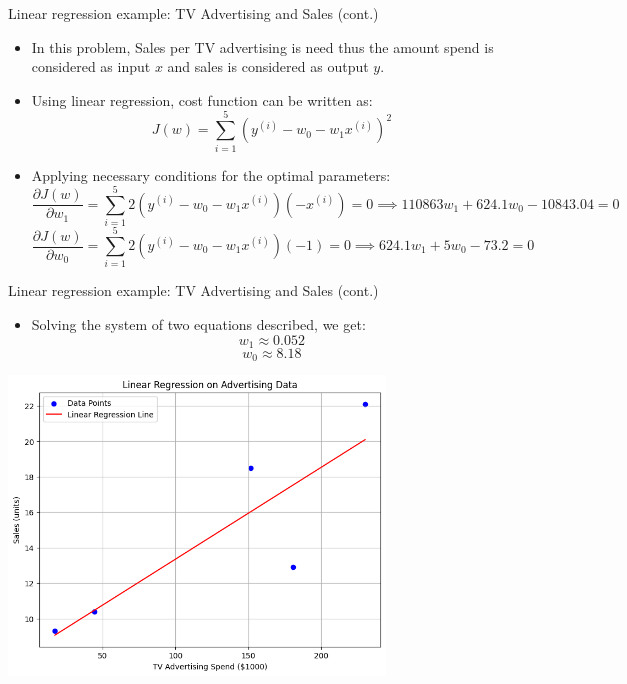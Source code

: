 \documentclass[serif, aspectratio=169]{beamer}
\begin{document}
\begin{frame}{Linear regression example: TV Advertising and Sales (cont.)}
    \begin{itemize}
        \item In this problem, Sales per TV advertising is need thus the amount spend is considered as input \( x \) and sales is considered as output \( y \). 
        \item Using linear regression, cost function can be written as:
        \[
        J(w) = \sum_{i=1}^{5} \left( y^{(i)} - w_0 - w_1 x^{(i)} \right)^2
        \]
        \item Applying necessary conditions for the optimal parameters:
        \[ 
        \frac{\partial J(w)}{\partial w_1} = \sum_{i=1}^{5} 2 \left( y^{(i)} - w_0 - w_1 x^{(i)} \right) (-x^{(i)}) = 0 \implies 110863 w_1 + 624.1 w_0 - 10843.04 = 0
        \]
        \[
        \frac{\partial J(w)}{\partial w_0} = \sum_{i=1}^{5} 2 \left( y^{(i)} - w_0 - w_1 x^{(i)} \right) (-1) = 0 \implies 624.1 w_1 + 5 w_0 - 73.2 = 0
        \]
    \end{itemize}
\end{frame}

\begin{frame}{Linear regression example: TV Advertising and Sales (cont.)}
\begin{minipage}{0.4\textwidth}
    \begin{itemize}
        \item Solving the system of two equations described, we get:
        \[ w_1 \approx 0.052 \]
        \[ w_0 \approx 8.18 \]
    \end{itemize}
\end{minipage}%
\begin{minipage}{0.55\textwidth}
\centering
\includegraphics[width=0.75\textwidth]{pic/boston.png}
\end{minipage}

\end{frame}
\end{document}
